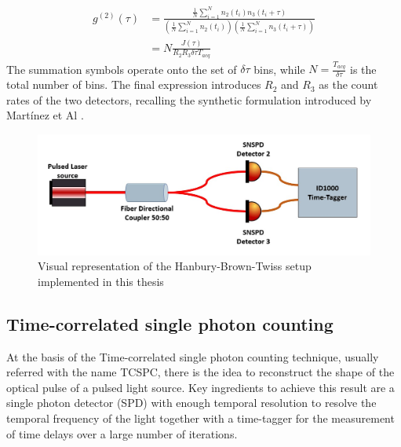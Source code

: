 \begin{align}
g^{(2)}(\tau) &= 
\frac{ \frac{1}{N} \sum_{i=1}^{N} n_2(t_i) n_3(t_i + \tau)}
     { \left( \frac{1}{N} \sum_{i=1}^{N} n_2(t_i) \right)
       \left( \frac{1}{N} \sum_{i=1}^{N} n_3(t_i + \tau) \right) }
\label{Riemann_g2} \\
&= N \frac{J(\tau)}{R_2 R_3 \delta \tau T_{acq}}
\label{Martinez_g2}
\end{align}
The summation symbols operate onto the set of $\delta \tau$ bins, while $N=\frac{T_{acq}}{\delta \tau}$ is the total number of bins.
The final expression introduces $R_2$ and $R_3$ as the count rates of the two detectors, recalling the synthetic formulation introduced by Martínez et Al \cite{PhysRevB.94.121405}.



\begin{figure}[hbtp]
\centering
\includegraphics[width=1\textwidth]{HBT_Sketch}
\caption{Visual representation of the Hanbury-Brown-Twiss setup implemented in this thesis}
\label{HBT_Sketch}
\end{figure}






\subsection{Time-correlated single photon counting}
\label{subs:TCSPC}

At the basis of the Time-correlated single photon counting technique, usually referred with the name TCSPC, there is the idea to reconstruct the shape of the optical pulse of a pulsed light source.
Key ingredients to achieve this result are a single photon detector (SPD) with enough temporal resolution to resolve the temporal frequency of the light together with a time-tagger for the measurement of time delays over a large number of iterations.

